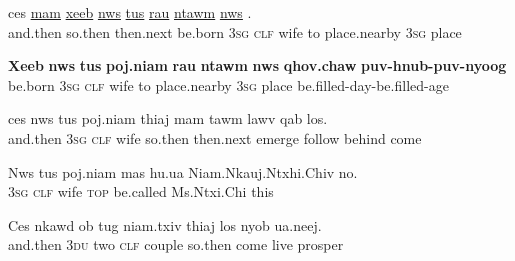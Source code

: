 \documentclass[output=paper]{LSP/langsci}
\begin{document}
\begin{exe}
 \label{JaexApp11}
\gll ces \underline{}  \underline{mam} \underline{xeeb} \underline{nws} \underline{tus}  \underline{} \underline{rau} \underline{ntawm} \underline{nws}  \underline{}.\\
     and.then so.then  then.next be.born \textsc{3sg} \textsc{clf} wife to place.nearby \textsc{3sg} place\\
\glt  {}
\end{exe}
 
\begin{exe}
 \label{JaexApp12}
\gll \textbf{Xeeb} \textbf{nws} \textbf{tus} \textbf{poj.niam} \textbf{rau} \textbf{ntawm} \textbf{nws} \textbf{qhov.chaw} \textbf{puv-hnub-puv-nyoog}\\
     be.born \textsc{3sg} \textsc{clf} wife to place.nearby \textsc{3sg} place be.filled-day-be.filled-age\\
\glt {}
\end{exe}

\begin{exe}
 \label{JaexApp13}
\gll ces nws tus poj.niam thiaj mam tawm lawv qab los.\\
and.then \textsc{3sg} \textsc{clf} wife so.then then.next emerge follow behind come\\
\glt {}
\end{exe}

\begin{exe}
 \label{JaexApp14}
\gll Nws tus poj.niam mas hu.ua Niam.Nkauj.Ntxhi.Chiv no.\\
     \textsc{3sg} \textsc{clf} wife \textsc{top} be.called Ms.Ntxi.Chi this\\
\glt {}
\end{exe}

\begin{exe}
 \label{JaexApp15}
\gll Ces nkawd ob tug niam.txiv thiaj los nyob ua.neej.\\
     and.then \textsc{3du} two \textsc{clf} couple so.then come live prosper\\
\glt {}
\end{exe}
\end{document}
